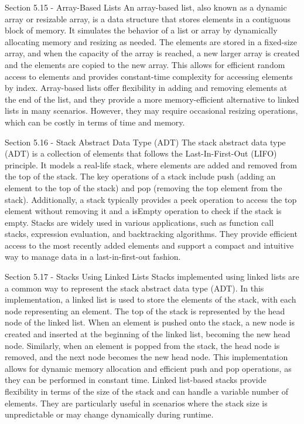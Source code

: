 \begin{notes}{Section 5.15 - Array-Based Lists}
    An array-based list, also known as a dynamic array or resizable array, is a data structure that stores elements in a contiguous block of memory. It simulates the behavior of a list or array by dynamically allocating memory and resizing as needed. The elements are stored in a fixed-size array, and when the capacity of the array is reached, a new larger 
    array is created and the elements are copied to the new array. This allows for efficient random access to elements and provides constant-time complexity for accessing elements by index. Array-based lists offer flexibility in adding and removing elements at the end of the list, and they provide a more memory-efficient alternative to linked lists in many 
    scenarios. However, they may require occasional resizing operations, which can be costly in terms of time and memory.
\end{notes}

\begin{notes}{Section 5.16 - Stack Abstract Data Type (ADT)}
    The stack abstract data type (ADT) is a collection of elements that follows the Last-In-First-Out (LIFO) principle. It models a real-life stack, where elements are added and removed from the top of the stack. The key operations of a stack include push (adding an element to the top of the stack) and pop (removing the top element from the stack). Additionally, 
    a stack typically provides a peek operation to access the top element without removing it and a isEmpty operation to check if the stack is empty. Stacks are widely used in various applications, such as function call stacks, expression evaluation, and backtracking algorithms. They provide efficient access to the most recently added elements and support a compact 
    and intuitive way to manage data in a last-in-first-out fashion.
\end{notes}

\begin{notes}{Section 5.17 - Stacks Using Linked Lists}
    Stacks implemented using linked lists are a common way to represent the stack abstract data type (ADT). In this implementation, a linked list is used to store the elements of the stack, with each node representing an element. The top of the stack is represented by the head node of the linked list. When an element is pushed onto the stack, a new node is created 
    and inserted at the beginning of the linked list, becoming the new head node. Similarly, when an element is popped from the stack, the head node is removed, and the next node becomes the new head node. This implementation allows for dynamic memory allocation and efficient push and pop operations, as they can be performed in constant time. Linked list-based stacks 
    provide flexibility in terms of the size of the stack and can handle a variable number of elements. They are particularly useful in scenarios where the stack size is unpredictable or may change dynamically during runtime.
\end{notes}

